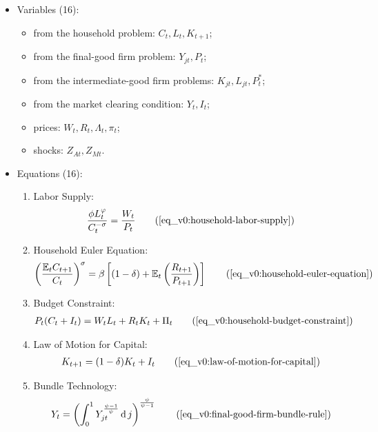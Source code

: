\documentclass[../thesis.tex]{subfiles}
\begin{document}
	{\singlespacing
		
		\begin{itemize}
			\item Variables (16):
			
			\begin{itemize}
				\item from the household problem: $C_t, L_t, K_{t+1}$;
				\item from the final-good firm problem: $Y_{jt}, P_t$;
				\item from the intermediate-good firm problems: $K_{jt}, L_{jt}, P_t^\ast$;
				\item from the market clearing condition: $Y_t, I_t$;
				\item prices: $W_t, R_t, \Lambda_t, \pi_t$;
				\item shocks: $Z_{At}, Z_{Mt}$.
			\end{itemize}
			\item Equations (16):
			
			\begin{enumerate}
				\item Labor Supply:
				\begin{align}
					\frac{\phi L_t^{\varphi}}{C_t^{-\sigma}} = \frac{W_t}{P_t}
					\tag{\ref{eq_v0:household-labor-supply}}
				\end{align}
				
				\item Household Euler Equation:
				\begin{align}
					\left( \frac{\mathbb{E}_t C_{t+1}}{C_t} \right)^\sigma = \beta \left[ (1-\delta) + \mathbb{E}_t \left(\frac{R_{t+1}}{P_{t+1}}\right) \right]
					\tag{\ref{eq_v0:household-euler-equation}}
				\end{align}
				
				\item Budget Constraint: 
				\begin{align}
					P_t (C_t + I_t) = W_t L_t + R_t K_t + \Pi_t
					\tag{\ref{eq_v0:household-budget-constraint}}
				\end{align}
				
				\item Law of Motion for Capital:
				\begin{align}
					K_{t+1} = (1-\delta)K_t + I_t
					\tag{\ref{eq_v0:law-of-motion-for-capital}}
				\end{align}
				
				\item Bundle Technology:
				\begin{align}
					Y_t = \left( \int_{0}^{1} Y_{jt}^{\frac{\psi-1}{\psi}} \dif j \right)^{\frac{\psi}{\psi-1}}
					\tag{\ref{eq_v0:final-good-firm-bundle-rule}}
				\end{align}
				

\end{enumerate}
\end{itemize}}
\end{document}
